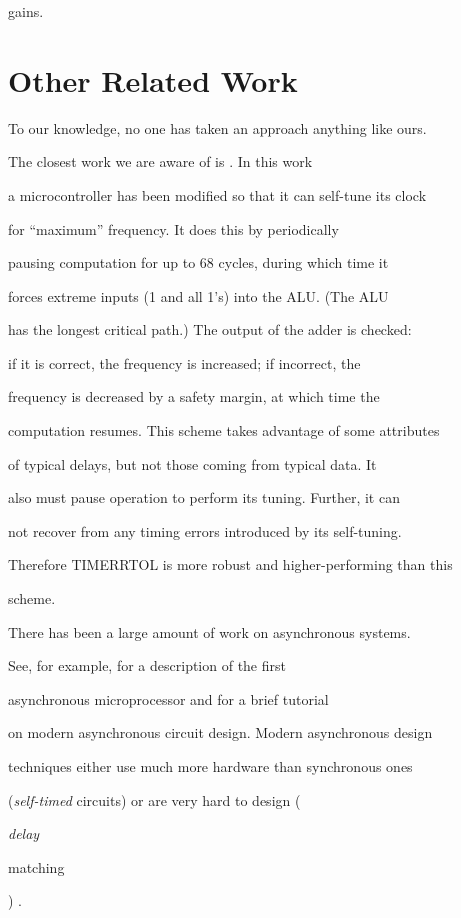 \documentclass[12pt,dvips]{article}
\begin{document}
gains.







\section{Other Related Work}

\label{relatedwork}

To our knowledge, no one has taken an approach anything like ours.

The closest work we are aware of is \cite{Olivieri99}. In this work

a microcontroller has been modified so that it can self-tune its clock

for ``maximum'' frequency. It does this by periodically

pausing computation for up to 68 cycles, during which time it

forces extreme inputs (1 and all 1's) into the ALU. (The ALU

has the longest critical path.) The output of the adder is checked:

if it is correct, the frequency is increased; if incorrect, the

frequency is decreased by a safety margin, at which time the

computation resumes. This scheme takes advantage of some attributes

of typical delays, but not those coming from typical data. It

also must pause operation to perform its tuning. Further, it can

not recover from any timing errors introduced by its self-tuning.

Therefore TIMERRTOL is more robust and higher-performing than this

scheme.



There has been a large amount of work on asynchronous systems.

See, for example, \cite{Martin89} for a description of the first

asynchronous microprocessor and \cite{Furber96} for a brief tutorial

on modern asynchronous circuit design. Modern asynchronous design

techniques either use much more hardware than synchronous ones

({\it self-timed} circuits) or are very hard to design ({\it delay

matching}) \cite{Sutherland89}.
\end{document}
